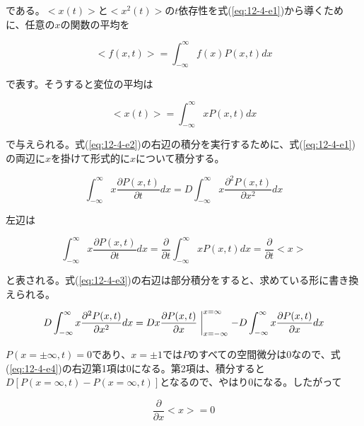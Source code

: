 \documentclass{jsarticle}
\begin{document}
        である。$<x(t)>$と$<x^{2}(t)>$の$t$依存性を式(\ref{eq:12-4-e1})から導くために、任意の$x$の関数の平均を
        
        \begin{equation}
            <f(x,t)> = \int_{-\infty}^{\infty} f(x)P(x,t)dx
        \end{equation}
        
        で表す。そうすると変位の平均は
        
        \begin{equation}
            <x(t)> = \int_{-\infty}^{\infty} xP(x,t)dx
            \label{eq:12-4-e2}
        \end{equation}
        
        で与えられる。式(\ref{eq:12-4-e2})の右辺の積分を実行するために、式(\ref{eq:12-4-e1})の両辺に$x$を掛けて形式的に$x$について積分する。
        
        \begin{equation}
            \int_{-\infty}^{\infty} x \frac{\partial P(x,t)}{\partial t}dx = D \int_{-\infty}^{\infty} x \frac{\partial^{2} P(x,t)}{\partial x^{2}}dx
            \label{eq:12-4-e3}
        \end{equation}
        
        左辺は
        
        \begin{equation}
            \int_{-\infty}^{\infty} x \frac{\partial P(x,t)}{\partial t}dx = \frac{\partial}{\partial t} \int_{-\infty}^{\infty} x P(x,t)dx = \frac{\partial}{\partial t} <x>
        \end{equation}
        
        と表される。式(\ref{eq:12-4-e3})の右辺は部分積分をすると、求めている形に書き換えられる。
        
        \begin{equation}
            D \int_{-\infty}^{\infty} x \frac{\partial^{2} P(x,t)}{\partial x^{2}}dx = D x \frac{\partial P(x,t)}{\partial x}\biggm|_{x = -\infty}^{x = \infty} - D \int_{-\infty}^{\infty} x \frac{\partial P(x,t)}{\partial x}dx
            \label{eq:12-4-e4}
        \end{equation}
        
        $P(x=\pm \infty, t) = 0 $であり、$x=\pm 1$では$P$のすべての空間微分は$0$なので、式(\ref{eq:12-4-e4})の右辺第1項は0になる。第2項は、積分すると$D[P(x = \infty, t)-P(x = \infty, t)]$となるので、やはり0になる。したがって
        
        \begin{equation}
            \frac{\partial}{\partial x}<x> = 0
        \end{equation}
        
\end{document}
